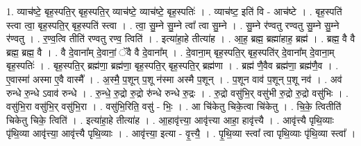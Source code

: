 \documentclass[17pt]{extarticle}
\begin{document}
1. व्याच॑ष्टे॒ बृह॒स्पति॒र् बृह॒स्पति॒र् व्याच॑ष्टे॒ व्याच॑ष्टे॒ बृह॒स्पतिः॑ । . व्याच॑ष्ट॒ इति॑ वि - आच॑ष्टे । . बृह॒स्पति॑ स्त्वा त्वा॒ बृह॒स्पति॒र् बृह॒स्पति॑ स्त्वा । . त्वा॒ सु॒म्ने सु॒म्ने त्वा᳚ त्वा सु॒म्ने । . सु॒म्ने र॑ण्वतु रण्वतु सु॒म्ने सु॒म्ने र॑ण्वतु । . र॒ण्व॒त्वि तीति॑ रण्वतु रण्व॒ त्विति॑ । . इत्या॑हा॒हे तीत्या॑ह । . आ॒ह॒ ब्रह्म॒ ब्रह्मा॑हाह॒ ब्रह्म॑ । . ब्रह्म॒ वै वै ब्रह्म॒ ब्रह्म॒ वै । . वै दे॒वाना᳚म् दे॒वानां॒ ॅवै वै दे॒वाना᳚म् । . दे॒वाना॒म् बृह॒स्पति॒र् बृह॒स्पति॑र् दे॒वाना᳚म् दे॒वाना॒म् बृह॒स्पतिः॑ । . बृह॒स्पति॒र् ब्रह्म॑णा॒ ब्रह्म॑णा॒ बृह॒स्पति॒र् बृह॒स्पति॒र् ब्रह्म॑णा । . ब्रह्म॑ णै॒वैव ब्रह्म॑णा॒ ब्रह्म॑णै॒व । . ए॒वास्मा॑ अस्मा ए॒वै वास्मै᳚ । . अ॒स्मै॒ प॒शून् प॒शू न॑स्मा अस्मै प॒शून् । . प॒शून वाव॑ प॒शून् प॒शू नव॑ । . अव॑ रुन्धे रु॒न्धे ऽवाव॑ रुन्धे । . रु॒न्धे॒ रु॒द्रो रु॒द्रो रु॑न्धे रुन्धे रु॒द्रः । . रु॒द्रो वसु॑भि॒र् वसु॑भी रु॒द्रो रु॒द्रो वसु॑भिः । . वसु॑भि॒रा वसु॑भि॒र् वसु॑भि॒रा । . वसु॑भि॒रिति॒ वसु॑ - भिः॒ । . आ चि॑केतु चिके॒त्वा चि॑केतु । . चि॒के॒ त्वितीति॑ चिकेतु चिके॒ त्विति॑ । . इत्या॑हा॒हे तीत्या॑ह । . आ॒हावृ॑त्त्या॒ आवृ॑त्त्या आहा॒ हावृ॑त्त्यै । . आवृ॑त्त्यै पृथि॒व्याः पृ॑थि॒व्या आवृ॑त्त्या॒ आवृ॑त्त्यै पृथि॒व्याः । . आवृ॑त्त्या॒ इत्या - वृ॒त्त्यै॒ । . पृ॒थि॒व्या स्त्वा᳚ त्वा पृथि॒व्याः पृ॑थि॒व्या स्त्वा᳚ । \newline
\end{document}

